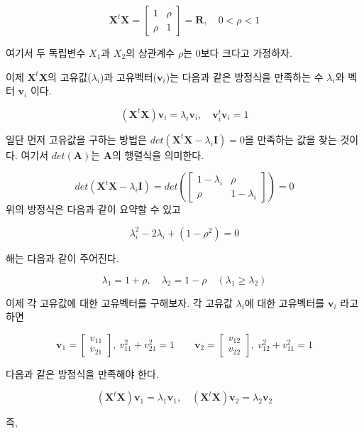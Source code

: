 \documentclass[
]{book}
\begin{document}
\[  \bm X^t \bm X =
\begin{bmatrix}
1  &  \rho \\
\rho & 1 
\end{bmatrix} 
=\bm R, \quad
0 < \rho < 1
\]

여기서 두 독립변수 \(X_1\)과 \(X_2\)의 상관계수 \(\rho\)는 0보다 크다고 가정하자.

이제 \(\bm X^t \bm X\)의 고유값(\(\lambda_i\))과 고유벡터(\(\bm v_i\))는 다음과 같은 방정식을 만족하는 수 \(\lambda_i\)와 벡터 \(\bm v_i\) 이다.

\[ (\bm X^t \bm X) \bm v_i = \lambda_i \bm v_i, \quad \bm v_i^t \bm v_i=1  \]

일단 먼저 고유값을 구하는 방법은 \(det(\bm X^t \bm X - \lambda_i \bm I ) =0\)을 만족하는
값을 찾는 것이다. 여기서 \(det(\bm A)\)는 \(\bm A\)의 행렬식을 의미한다.

\[ 
det(\bm X^t \bm X - \lambda_i \bm I ) = det \left ( 
\begin{bmatrix}
1-\lambda_i  &  \rho \\
\rho & 1-\lambda_i 
\end{bmatrix}
 \right ) =0
\]
위의 방정식은 다음과 같이 요약할 수 있고

\[ \lambda_i^2 -2 \lambda_i + (1-\rho^2) =0 \]

해는 다음과 같이 주어진다.

\[ \lambda_1 = 1+ \rho, \quad \lambda_2 = 1 -\rho \quad (\lambda_1 \ge \lambda_2) \]

이제 각 고유값에 대한 고유벡터를 구해보자. 각 고유값 \(\lambda_i\)에 대한 고유벡터를 \(\bm v_i\) 라고 하면

\[ 
\bm v_1 = 
\begin{bmatrix} 
 v_{11} \\
 v_{21}
\end{bmatrix},
~ v^2_{11}+v^2_{21}=1
\quad \quad
\bm v_2 = 
\begin{bmatrix} 
 v_{12} \\
 v_{22}
\end{bmatrix},~
v^2_{12}+v^2_{11}=1
\]

다음과 같은 방정식을 만족해야 한다.

\[ (\bm X^t \bm X) \bm v_1 = \lambda_1 \bm v_1 , \quad  (\bm X^t \bm X) \bm v_2 = \lambda_2 \bm v_2 \]

즉,
\end{document}

